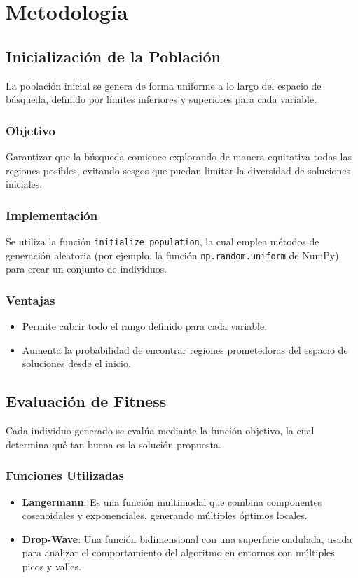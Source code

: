 \chapter{Metodolog\'ia}

\section{Inicializaci\'on de la Poblaci\'on}
La poblaci\'on inicial se genera de forma uniforme a lo largo del espacio de b\'usqueda, definido por l\'imites inferiores y superiores para cada variable.

\subsection*{Objetivo}
Garantizar que la b\'usqueda comience explorando de manera equitativa todas las regiones posibles, evitando sesgos que puedan limitar la diversidad de soluciones iniciales.

\subsection*{Implementaci\'on}
Se utiliza la funci\'on \texttt{initialize\_population}, la cual emplea m\'etodos de generaci\'on aleatoria (por ejemplo, la funci\'on \texttt{np.random.uniform} de NumPy) para crear un conjunto de individuos.

\subsection*{Ventajas}
\begin{itemize}
    \item Permite cubrir todo el rango definido para cada variable.
    \item Aumenta la probabilidad de encontrar regiones prometedoras del espacio de soluciones desde el inicio.
\end{itemize}

\section{Evaluaci\'on de Fitness}

Cada individuo generado se eval\'ua mediante la funci\'on objetivo, la cual determina qu\'e tan buena es la soluci\'on propuesta.

\subsection*{Funciones Utilizadas}
\begin{itemize}
    \item \textbf{Langermann}: Es una funci\'on multimodal que combina componentes cosenoidales y exponenciales, generando m\'ultiples \'optimos locales.
    \item \textbf{Drop-Wave}: Una funci\'on bidimensional con una superficie ondulada, usada para analizar el comportamiento del algoritmo en entornos con m\'ultiples picos y valles.
\end{itemize}

